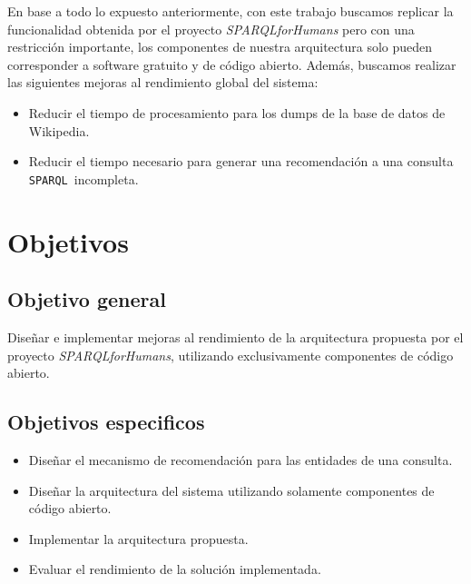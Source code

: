 \documentclass[conference,compsoc]{IEEEtran}
\newcommand{\spql}{\texttt{SPARQL}\ }
\begin{document}

En base a todo lo expuesto anteriormente, con este trabajo buscamos replicar la funcionalidad obtenida por
el proyecto \textit{SPARQLforHumans} pero con una restricción importante, los componentes de nuestra arquitectura
solo pueden corresponder a software gratuito y de código abierto. Además, buscamos realizar las siguientes mejoras
al rendimiento global del sistema:

\begin{itemize}
    \item Reducir el tiempo de procesamiento para los dumps de la base de datos de Wikipedia.
    \item Reducir el tiempo necesario para generar una recomendación a una consulta \spql incompleta.
\end{itemize}

\section{Objetivos}

    \subsection{Objetivo general}

Diseñar e implementar mejoras al rendimiento de la arquitectura propuesta por el proyecto
\textit{SPARQLforHumans}, utilizando exclusivamente componentes de código abierto.

    \subsection{Objetivos especificos}

\begin{itemize}
    \item Diseñar el mecanismo de recomendación para las entidades de una consulta.
    \item Diseñar la arquitectura del sistema utilizando solamente componentes de código abierto.
    \item Implementar la arquitectura propuesta.
    \item Evaluar el rendimiento de la solución implementada.
\end{itemize}
\end{document}
